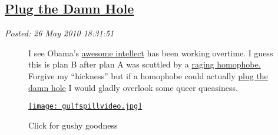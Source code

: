 %

\subsection*{\href{http://bakerjd99.wordpress.com/2010/05/26/plug-the-damn-hole/}{Plug the Damn Hole}}


\noindent\emph{Posted: 26 May 2010 18:31:51}
\vspace{6pt}

\captionsetup[figure]{labelformat=empty}
\begin{figure}[ht]
\begin{minipage}[b]{0.50\textwidth}
\setlength{\parindent}{\minindent}
I see Obama's \href{http://www.youtube.com/watch?v=PKx1C0gY6Qk}{awesome
intellect} has been working overtime. I guess this is plan B after plan
A was scuttled by a \href{http://metroweekly.com/news/?ak=5208}{raging
homophobe.} Forgive my ``hickness'' but if a homophobe could actually
\href{http://thehill.com/blogs/blog-briefing-room/news/99713-obama-to-aides-plug-the-damn-hole?page=46}{plug
the damn hole} I would gladly overlook some queer queasiness.
\end{minipage}
\hspace{1pt}
\begin{minipage}[b]{0.40\textwidth}
\centering
\href{http://www.youtube.com/watch?v=rlPPFcy-3Vo}{\texttt{[image: gulfspillvideo.jpg]}}
\caption{Click for gushy goodness}
\label{fig:gulfspill}
\end{minipage}
\end{figure}




%